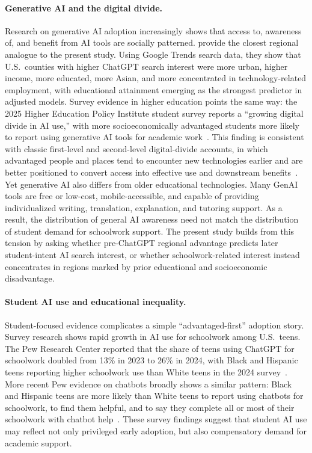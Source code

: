 \documentclass[11pt]{article}
\begin{document}
\paragraph{Generative AI and the digital divide.}
Research on generative AI adoption increasingly shows that access to, awareness of, and benefit from AI tools are socially patterned. \citet{daepp2025} provide the closest regional analogue to the present study. Using Google Trends search data, they show that U.S.\ counties with higher ChatGPT search interest were more urban, higher income, more educated, more Asian, and more concentrated in technology-related employment, with educational attainment emerging as the strongest predictor in adjusted models. Survey evidence in higher education points the same way: the 2025 Higher Education Policy Institute student survey reports a ``growing digital divide in AI use,'' with more socioeconomically advantaged students more likely to report using generative AI tools for academic work~\citep{hepi2025}. This finding is consistent with classic first-level and second-level digital-divide accounts, in which advantaged people and places tend to encounter new technologies earlier and are better positioned to convert access into effective use and downstream benefits~\citep{vandijk2005, hargittai2002}. Yet generative AI also differs from older educational technologies. Many GenAI tools are free or low-cost, mobile-accessible, and capable of providing individualized writing, translation, explanation, and tutoring support. As a result, the distribution of general AI awareness need not match the distribution of student demand for schoolwork support. The present study builds from this tension by asking whether pre-ChatGPT regional advantage predicts later student-intent AI search interest, or whether schoolwork-related interest instead concentrates in regions marked by prior educational and socioeconomic disadvantage.

\paragraph{Student AI use and educational inequality.}
Student-focused evidence complicates a simple ``advantaged-first'' adoption story. Survey research shows rapid growth in AI use for schoolwork among U.S.\ teens. The Pew Research Center reported that the share of teens using ChatGPT for schoolwork doubled from 13\% in 2023 to 26\% in 2024, with Black and Hispanic teens reporting higher schoolwork use than White teens in the 2024 survey~\citep{sidoti2025}. More recent Pew evidence on chatbots broadly shows a similar pattern: Black and Hispanic teens are more likely than White teens to report using chatbots for schoolwork, to find them helpful, and to say they complete all or most of their schoolwork with chatbot help~\citep{pew2026}. These survey findings suggest that student AI use may reflect not only privileged early adoption, but also compensatory demand for academic support.
\end{document}
